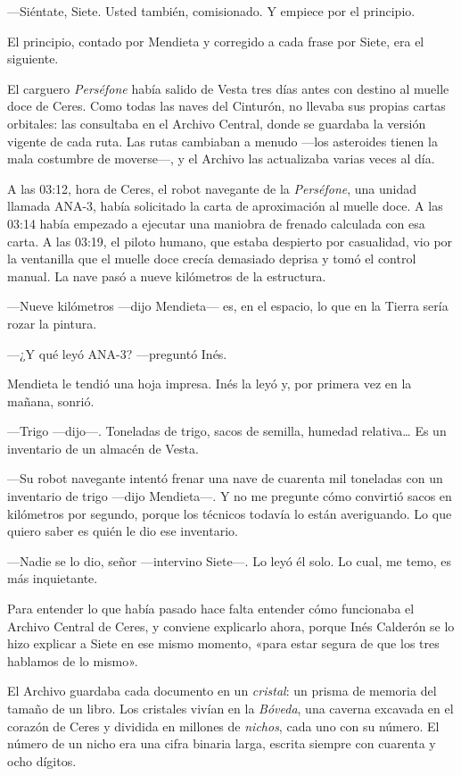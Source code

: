 ---Siéntate, Siete. Usted también, comisionado. Y empiece por el principio.

\escena
El principio, contado por Mendieta y corregido a cada frase por Siete, era el siguiente.

El carguero \emph{Perséfone} había salido de Vesta tres días antes con destino al muelle doce de Ceres. Como todas las naves del Cinturón, no llevaba sus propias cartas orbitales: las consultaba en el Archivo Central, donde se guardaba la versión vigente de cada ruta. Las rutas cambiaban a menudo ---los asteroides tienen la mala costumbre de moverse---\nobreak, y el Archivo las actualizaba varias veces al día.

A las 03:12, hora de Ceres, el robot navegante de la \emph{Perséfone}, una unidad llamada ANA-3, había solicitado la carta de aproximación al muelle doce. A las 03:14 había empezado a ejecutar una maniobra de frenado calculada con esa carta. A las 03:19, el piloto humano, que estaba despierto por casualidad, vio por la ventanilla que el muelle doce crecía demasiado deprisa y tomó el control manual. La nave pasó a nueve kilómetros de la estructura.

---Nueve kilómetros ---dijo Mendieta--- es, en el espacio, lo que en la Tierra sería rozar la pintura.

---¿Y qué leyó ANA-3? ---preguntó Inés.

Mendieta le tendió una hoja impresa. Inés la leyó y, por primera vez en la mañana, sonrió.

---Trigo ---dijo---\nobreak. Toneladas de trigo, sacos de semilla, humedad relativa\ldots{} Es un inventario de un almacén de Vesta.

---Su robot navegante intentó frenar una nave de cuarenta mil toneladas con un inventario de trigo ---dijo Mendieta---\nobreak. Y no me pregunte cómo convirtió sacos en kilómetros por segundo, porque los técnicos todavía lo están averiguando. Lo que quiero saber es quién le dio ese inventario.

---Nadie se lo dio, señor ---intervino Siete---\nobreak. Lo leyó él solo. Lo cual, me temo, es más inquietante.

\escena
Para entender lo que había pasado hace falta entender cómo funcionaba el Archivo Central de Ceres, y conviene explicarlo ahora, porque Inés Calderón se lo hizo explicar a Siete en ese mismo momento, «para estar segura de que los tres hablamos de lo mismo».

El Archivo guardaba cada documento en un \emph{cristal}: un prisma de memoria del tamaño de un libro. Los cristales vivían en la \emph{Bóveda}, una caverna excavada en el corazón de Ceres y dividida en millones de \emph{nichos}, cada uno con su número. El número de un nicho era una cifra binaria larga, escrita siempre con cuarenta y ocho dígitos.

